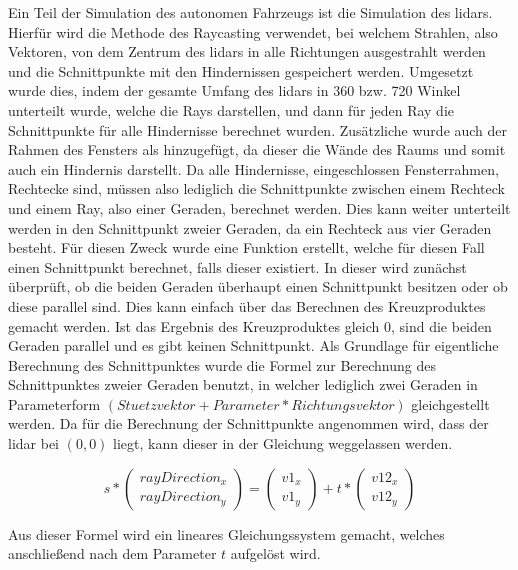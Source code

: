 Ein Teil der Simulation des autonomen Fahrzeugs ist die Simulation des \ac{lidar}s. Hierfür wird die Methode des Raycasting verwendet, 
bei welchem Strahlen, also Vektoren, von dem Zentrum des \ac{lidar}s in alle Richtungen ausgestrahlt werden und 
die Schnittpunkte mit den Hindernissen gespeichert werden.
Umgesetzt wurde dies, indem der gesamte Umfang des \ac{lidar}s in 360 bzw. 720 Winkel unterteilt wurde, 
welche die Rays darstellen, und dann für jeden Ray die Schnittpunkte für alle Hindernisse berechnet wurden. 
Zusätzliche wurde auch der Rahmen des Fensters als hinzugefügt, da dieser die Wände des Raums und somit auch ein Hindernis darstellt. 
Da alle Hindernisse, eingeschlossen Fensterrahmen, Rechtecke sind, müssen also lediglich die Schnittpunkte zwischen einem Rechteck und einem Ray, 
also einer Geraden, berechnet werden. Dies kann weiter unterteilt werden in den Schnittpunkt zweier Geraden, da ein Rechteck aus vier Geraden besteht. 
Für diesen Zweck wurde eine Funktion erstellt, welche für diesen Fall einen Schnittpunkt berechnet, falls dieser existiert. 
In dieser wird zunächst überprüft, ob die beiden Geraden überhaupt einen Schnittpunkt besitzen oder ob diese parallel sind. 
Dies kann einfach über das Berechnen des Kreuzproduktes gemacht werden. 
Ist das Ergebnis des Kreuzproduktes gleich \(0\), sind die beiden Geraden parallel und es gibt keinen Schnittpunkt. 
Als Grundlage für eigentliche Berechnung des Schnittpunktes wurde die Formel zur Berechnung des Schnittpunktes zweier Geraden benutzt, 
in welcher lediglich zwei Geraden in Parameterform \((Stuetzvektor + Parameter * Richtungsvektor)\) gleichgestellt werden. 
Da für die Berechnung der Schnittpunkte angenommen wird, dass der \ac{lidar} bei \((0, 0)\) liegt, kann dieser in der Gleichung weggelassen werden. 

\[
s * 
\begin{pmatrix}
    rayDirection_x \\ 
    rayDirection_y
\end{pmatrix}
= 
\begin{pmatrix}
    v1_x \\ 
    v1_y
\end{pmatrix}
+ t * 
\begin{pmatrix}
    v12_x \\ 
    v12_y
\end{pmatrix}
\]

Aus dieser Formel wird ein lineares Gleichungssystem gemacht, welches anschließend nach dem Parameter \(t\) aufgelöst wird.

